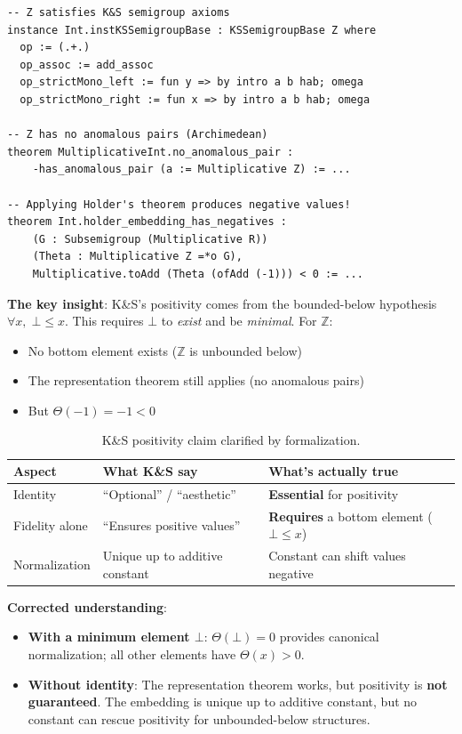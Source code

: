 \documentclass[11pt]{article}
\begin{document}
\begin{lstlisting}[language=lean,caption={Counterexample: $\mathbb{Z}$ embedding has negatives.}]
-- Z satisfies K&S semigroup axioms
instance Int.instKSSemigroupBase : KSSemigroupBase Z where
  op := (.+.)
  op_assoc := add_assoc
  op_strictMono_left := fun y => by intro a b hab; omega
  op_strictMono_right := fun x => by intro a b hab; omega

-- Z has no anomalous pairs (Archimedean)
theorem MultiplicativeInt.no_anomalous_pair :
    -has_anomalous_pair (a := Multiplicative Z) := ...

-- Applying Holder's theorem produces negative values!
theorem Int.holder_embedding_has_negatives :
    (G : Subsemigroup (Multiplicative R))
    (Theta : Multiplicative Z =*o G),
    Multiplicative.toAdd (Theta (ofAdd (-1))) < 0 := ...
\end{lstlisting}

\textbf{The key insight}: K\&S's positivity comes from the bounded-below hypothesis
$\forall x,\; \bot \leq x$.
This requires $\bot$ to \emph{exist} and be \emph{minimal}. For $\mathbb{Z}$:
\begin{itemize}[noitemsep]
\item No bottom element exists ($\mathbb{Z}$ is unbounded below)
\item The representation theorem still applies (no anomalous pairs)
\item But $\Theta(-1) = -1 < 0$
\end{itemize}

\begin{table}[h]
\centering
\small
\begin{tabular}{lll}
\toprule
\textbf{Aspect} & \textbf{What K\&S say} & \textbf{What's actually true} \\
\midrule
Identity & ``Optional'' / ``aesthetic'' & \textbf{Essential} for positivity \\
Fidelity alone & ``Ensures positive values'' & \textbf{Requires} a bottom element ($\bot \le x$) \\
Normalization & Unique up to additive constant & Constant can shift values negative \\
\bottomrule
\end{tabular}
\caption{K\&S positivity claim clarified by formalization.}
\end{table}

\textbf{Corrected understanding}:
\begin{itemize}[noitemsep]
\item \textbf{With a minimum element $\bot$}: $\Theta(\bot) = 0$ provides canonical
      normalization; all other elements have $\Theta(x) > 0$.
\item \textbf{Without identity}: The representation theorem works, but positivity is
      \textbf{not guaranteed}. The embedding is unique up to additive constant, but
      no constant can rescue positivity for unbounded-below structures.
\end{itemize}
\end{document}
